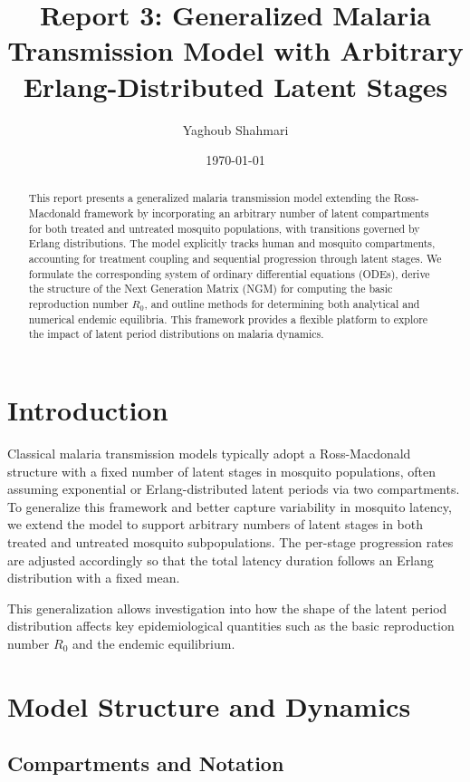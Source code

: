 \documentclass[12pt]{article}
\title{Report 3: Generalized Malaria Transmission Model with Arbitrary Erlang-Distributed Latent Stages}
\author{Yaghoub Shahmari}
\date{\today}
\begin{document}
\maketitle

\begin{abstract}
This report presents a generalized malaria transmission model extending the Ross-Macdonald framework by incorporating an arbitrary number of latent compartments for both treated and untreated mosquito populations, with transitions governed by Erlang distributions. The model explicitly tracks human and mosquito compartments, accounting for treatment coupling and sequential progression through latent stages. We formulate the corresponding system of ordinary differential equations (ODEs), derive the structure of the Next Generation Matrix (NGM) for computing the basic reproduction number \(R_0\), and outline methods for determining both analytical and numerical endemic equilibria. This framework provides a flexible platform to explore the impact of latent period distributions on malaria dynamics.
\end{abstract}

\section{Introduction}

Classical malaria transmission models typically adopt a Ross-Macdonald structure with a fixed number of latent stages in mosquito populations, often assuming exponential or Erlang-distributed latent periods via two compartments. To generalize this framework and better capture variability in mosquito latency, we extend the model to support arbitrary numbers of latent stages in both treated and untreated mosquito subpopulations. The per-stage progression rates are adjusted accordingly so that the total latency duration follows an Erlang distribution with a fixed mean.

This generalization allows investigation into how the shape of the latent period distribution affects key epidemiological quantities such as the basic reproduction number \(R_0\) and the endemic equilibrium.

\section{Model Structure and Dynamics}

\subsection{Compartments and Notation}
\end{document}
